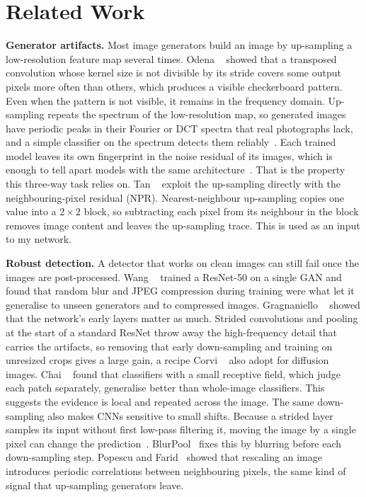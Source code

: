 \section{Related Work}
\label{sec:related}
\noindent\textbf{Generator artifacts.} Most image generators build an image by up-sampling a low-resolution feature map several times. Odena \etal~\cite{odena2016checkerboard} showed that a transposed convolution whose kernel size is not divisible by its stride covers some output pixels more often than others, which produces a visible checkerboard pattern. Even when the pattern is not visible, it remains in the frequency domain. Up-sampling repeats the spectrum of the low-resolution map, so generated images have periodic peaks in their Fourier or DCT spectra that real photographs lack, and a simple classifier on the spectrum detects them reliably~\cite{zhang2019spectrum,frank2020frequency}. Each trained model leaves its own fingerprint in the noise residual of its images, which is enough to tell apart models with the same architecture~\cite{yu2019attribution,marra2019fingerprints}. That is the property this three-way task relies on. Tan \etal~\cite{tan2024npr} exploit the up-sampling directly with the neighbouring-pixel residual (NPR). Nearest-neighbour up-sampling copies one value into a $2\times2$ block, so subtracting each pixel from its neighbour in the block removes image content and leaves the up-sampling trace. This is used as an input to my network.

\noindent\textbf{Robust detection.} A detector that works on clean images can still fail once the images are post-processed. Wang \etal~\cite{wang2020cnndetect} trained a ResNet-50 on a single GAN and found that random blur and JPEG compression during training were what let it generalise to unseen generators and to compressed images. Gragnaniello \etal~\cite{gragnaniello2021critical} showed that the network's early layers matter as much. Strided convolutions and pooling at the start of a standard ResNet throw away the high-frequency detail that carries the artifacts, so removing that early down-sampling and training on unresized crops gives a large gain, a recipe Corvi \etal~\cite{corvi2023diffusion} also adopt for diffusion images. Chai \etal~\cite{chai2020patch} found that classifiers with a small receptive field, which judge each patch separately, generalise better than whole-image classifiers. This suggests the evidence is local and repeated across the image. The same down-sampling also makes CNNs sensitive to small shifts. Because a strided layer samples its input without first low-pass filtering it, moving the image by a single pixel can change the prediction~\cite{azulay2019small}. BlurPool~\cite{zhang2019blurpool} fixes this by blurring before each down-sampling step. Popescu and Farid~\cite{popescu2005resampling} showed that rescaling an image introduces periodic correlations between neighbouring pixels, the same kind of signal that up-sampling generators leave. 
